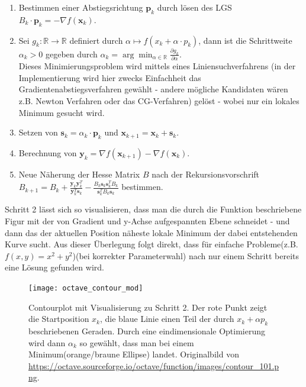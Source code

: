 \documentclass{article}
\theoremstyle{plain} %
\theoremstyle{definition} %
\begin{document}
\begin{enumerate}
  \item{ Bestimmen einer Abstiegsrichtung $\mathbf{p}_k$ durch lösen des LGS $B_k \cdot \mathbf{p}_k = - \nabla f(\mathbf{x}_k)$. }
  \item{ Sei $g_k: \mathbb{R} \rightarrow \mathbb{R}$ definiert durch $\alpha \mapsto f(x_k + \alpha \cdot p_k)$, dann ist die Schrittweite $\alpha_k > 0$ gegeben durch $\alpha_k = \arg \min_{\alpha \in \mathbb{R}} \frac{\partial g_k}{\partial \alpha}$.\\Dieses Minimierungsproblem wird mittels eines Liniensuchverfahrens (in der Implementierung wird hier zwecks Einfachheit das Gradientenabstiegsverfahren gewählt - andere mögliche Kandidaten wären z.B. Newton Verfahren oder das CG-Verfahren) gelöst - wobei nur ein lokales Minimum gesucht wird\cite{Dai}.}
  \item {Setzen von $\mathbf{s}_k = \alpha_k \cdot \mathbf{p}_k$ und $\mathbf{x}_{k+1} = \mathbf{x}_k + \mathbf{s}_k$.}
  \item {Berechnung von $\mathbf{y}_k = \nabla f(\mathbf{x}_{k+1}) - \nabla f(\mathbf{x}_k)$.}
  \item {Neue Näherung der Hesse Matrix $B$ nach der Rekursionsvorschrift $B_{k+1} = B_k + \frac{\mathbf{y}_k \mathbf{y}_k^T}{\mathbf{y}_k^T \mathbf{s}_k} - \frac{B_k \mathbf{s}_k \mathbf{s}_k^T B_k}{\mathbf{s}_k^T B_k \mathbf{s}_k}$ bestimmen.}
\end{enumerate}

Schritt 2 lässt sich so visualisieren, dass man die durch die Funktion beschriebene Figur mit der von Gradient und y-Achse aufgespannten Ebene schneidet - und dann das der aktuellen Position näheste lokale Minimum der dabei entstehenden Kurve sucht. Aus dieser Überlegung folgt direkt, dass für einfache Probleme(z.B. $f(x,y) = x^2 + y^2$)(bei korrekter Parameterwahl) nach nur einem Schritt bereits eine Lösung gefunden wird.

\begin{figure}[t]
  \centering
  \texttt{[image: octave\_contour\_mod]}
  \caption{Contourplot mit Visualisierung zu Schritt 2. Der rote Punkt zeigt die Startposition $x_k$, die blaue Linie einen Teil der durch $x_k + \alpha p_k$ beschriebenen Geraden. Durch eine eindimensionale Optimierung wird dann $\alpha_k$ so gewählt, dass man bei einem Minimum(orange/braune Ellipse) landet. Originalbild von \url{https://octave.sourceforge.io/octave/function/images/contour_101.png}.}
\end{figure}
\end{document}

